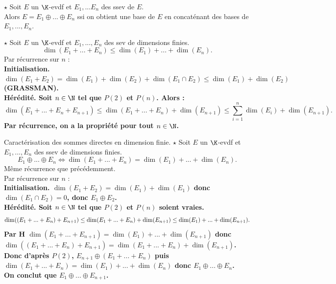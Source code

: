 \documentclass[11pt]{article}
\begin{document}
\vspace*{-0.8cm}

\begin{thm}{$\star$}{}
    Soit $E$ un $\K$-evdf et $E_1,...E_n$ des ssev de $E$.\\
    Alors $E=E_1\oplus...\oplus E_n$ ssi on obtient une base de $E$ en concaténant des bases de $E_1,...,E_n$.
\end{thm}

\begin{prop}{$\star$}{}
    Soit $E$ un $\K$-evdf et $E_1,...,E_n$ des sev de dimensions finies.
    \begin{equation*}
        \dim(E_1+...+E_n) \leq \dim(E_1) + ... + \dim(E_n).
    \end{equation*}
    \tcblower
    Par récurrence sur $n$ :\\
    \bf{Initialisation.} $\dim(E_1+E_2)=\dim(E_1)+\dim(E_2)+\dim(E_1\cap E_2) \leq \dim(E_1)+\dim(E_2)$ (GRASSMAN).\\
    \bf{Hérédité.} Soit $n\in\N$ tel que $P(2)$ et $P(n)$. Alors :
    \begin{equation*}
        \dim(E_1+...+E_n+E_{n+1})\leq \dim(E_1+...+E_n)+\dim(E_{n+1})\leq \sum_{i=1}^n\dim(E_i) + \dim(E_{n+1}).
    \end{equation*}
    Par récurrence, on a la propriété pour tout $n\in\N$.
\end{prop}

\begin{thm}{Caractérisation des sommes directes en dimension finie. $\star$}{}
    Soit $E$ un $\K$-evdf et $E_1,...,E_n$ des ssev de dimensions finies.
    \begin{equation*}
        E_1\oplus...\oplus E_n \iff \dim(E_1+...+E_n)=\dim(E_1)+...+\dim(E_n).
    \end{equation*}
    \tcblower
    \boxed{\ra} Même récurrence que précédemment.\\
    \boxed{\la} Par récurrence sur $n$ :\\
    \bf{Initialisation.} $\dim(E_1+E_2)=\dim(E_1)+\dim(E_1)$ donc $\dim(E_1\cap E_2)=0$, donc $E_1\oplus E_2$.\\
    \bf{Hérédité.} Soit $n\in\N$ tel que $P(2)$ et $P(n)$ soient vraies.
    \begin{equation*}
        \dim((E_1+...+E_n)+E_{n+1}) \leq \dim(E_1+...+E_n) + \dim(E_{n+1}) \leq \dim(E_1) + ... + \dim(E_{n+1}).\\
    \end{equation*}
    Par H \small$\dim(E_1+...+E_{n+1})=\dim(E_1)+...+\dim(E_{n+1})$ donc $\dim((E_1+...+E_n)+E_{n+1})=\dim(E_1+...+E_n)+\dim(E_{n+1})$.\\
    Donc d'après $P(2)$, $E_{n+1}\oplus(E_1+...+E_n)$ puis $\dim(E_1+...+E_n)=\dim(E_1)+...+\dim(E_n)$ donc $E_1\oplus...\oplus E_n$.\\
    On conclut que $E_1\oplus ... \oplus E_{n+1}$.
\end{thm}
\end{document}
